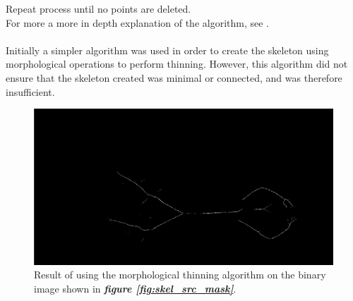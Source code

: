 \documentclass[a4paper, 12pt]{article}
\begin{document}
%
Repeat process until no points are deleted.\\
For more a more in depth explanation of the algorithm, see \cite{skeletonisation}.\\
\\
Initially a simpler algorithm\cite{skeletonisation_simple} was used in order to create the skeleton using morphological operations to perform thinning. However, this algorithm did not ensure that the skeleton created was minimal or connected, and was therefore insufficient.
\begin{figure}[H]
	\centering
	\includegraphics[width=\linewidth]{skel_simple.jpg}
	\caption{Result of using the morphological thinning algorithm on the binary image shown in \textbf{\emph{figure \ref{fig:skel_src_mask}}}.}
	\label{fig:skel_simple}
\end{figure}
\end{document}

